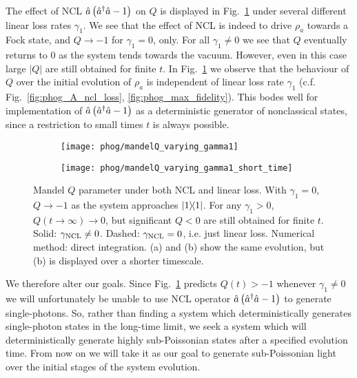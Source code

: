 The effect of NCL $\hat{a}\left(\hat{a}^\dagger \hat{a} - 1\right)$ on $Q$ is displayed in Fig.~\ref{fig:phog_ncl_Q} under several different linear loss rates $\gamma_1$. We see that the effect of NCL is indeed to drive $\rho_a$ towards a Fock state, and $Q \rightarrow -1$ for $\gamma_1 = 0$, only. For all $\gamma_1 \ne 0$ we see that $Q$ eventually returns to $0$ as the system tends towards the vacuum. However, even in this case large $\left|Q\right|$ are still obtained for finite $t$. In Fig.~\ref{fig:phog_ncl_Q} we observe that the behaviour of $Q$ over the initial evolution of $\rho_a$ is independent of linear loss rate $\gamma_1$ (c.f. Fig.~\ref{fig:phog_A_ncl_loss}, \ref{fig:phog_max_fidelity}). This bodes well for implementation of $\hat{a}\left(\hat{a}^\dagger \hat{a} - 1\right)$ as a deterministic generator of nonclassical states, since a restriction to small times $t$ is always possible.

\begin{figure}[htp]
\captionsetup{width=\linewidth}
\centering
	\begin{subfigure}{0.7\linewidth}
	\caption{}
	\texttt{[image: phog/mandelQ\_varying\_gamma1]}
	\end{subfigure}
	\begin{subfigure}{0.7\linewidth}
	\caption{}
	\texttt{[image: phog/mandelQ\_varying\_gamma1\_short\_time]}
	\end{subfigure}
\caption{\label{fig:phog_ncl_Q} Mandel $Q$ parameter under both NCL and linear loss. With $\gamma_1=0$, $Q \rightarrow -1$ as the system approaches $\dyad{1}$. For any $\gamma_1 > 0$, $Q\left(t\rightarrow\infty\right) \rightarrow 0$, but significant $Q < 0$ are still obtained for finite $t$. Solid: $\gamma_{\text{NCL}} \ne 0$. Dashed: $\gamma_{\text{NCL}} = 0$, i.e. just linear loss. Numerical method: direct integration. (a) and (b) show the same evolution, but (b) is displayed over a shorter timescale.}
\end{figure}

We therefore alter our goals. Since Fig.~\ref{fig:phog_ncl_Q} predicts $Q\left(t\right) > -1$ whenever $\gamma_1 \ne 0$ we will unfortunately be unable to use NCL operator $\hat{a}\left(\hat{a}^\dagger \hat{a} - 1\right)$ to generate single-photons. So, rather than finding a system which deterministically generates single-photon states in the long-time limit, we seek a system which will deterministically generate highly sub-Poissonian states after a specified evolution time. From now on we will take it as our goal to generate sub-Poissonian light over the initial stages of the system evolution.


